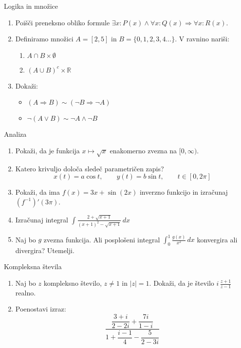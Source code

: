 \begin{frame}{Logika in množice}
	\begin{enumerate}
		\item
		Poišči preneksno obliko formule $\exists x: P(x) \land \forall x: Q(x) \Rightarrow \forall x: R(x)$.
		\item 
		Definiramo množici $A = [ 2,5 ]$ in $B = \{0, 1, 2, 3, 4 \ldots \}$.
		V ravnino nariši:
		\begin{enumerate}
		   \item $A \cap B \times \emptyset$
		   \item $(A \cup B)^c \times \mathbb{R}$
		\end{enumerate}
		
		\item
		Dokaži:
		\begin{itemize}
			\item $(A \Rightarrow B) \sim (\lnot B \Rightarrow \lnot A)$
			\item $\lnot (A \lor B) \sim \lnot A \land \lnot B$
		\end{itemize}
	\end{enumerate}
\end{frame}

\begin{frame}{Analiza}
	\begin{enumerate}
		\item
		Pokaži, da je funkcija $x \mapsto \sqrt{x}$ enakomerno zvezna na $[0,\infty)$.
		\item 
		Katero krivuljo določa sledeč parametričen zapis?
		$$
		   x(t) = a \cos t, \qquad
		   y(t) = b \sin t, \qquad
		   t \in [0, 2 \pi]
		$$ 
		
		\item
		Pokaži, da ima $f(x) = 3x + \sin(2x)$ inverzno funkcijo in izračunaj $(f^{-1})'(3\pi)$.
		
		\item
		Izračunaj integral 
		\( \displaystyle \int \frac{2+\sqrt{x+1}}{(x+1)^2-\sqrt{x+1}} \, dx \)
		\item 
		Naj bo $g$ zvezna funkcija. Ali posplošeni integral 
		\( \int_0^1 \frac{g(x)}{x^2}\,dx \)
		konvergira ali divergira? Utemelji.
	\end{enumerate}
\end{frame}

\begin{frame}{Kompleksna števila}
	\begin{enumerate}
		\item
		Naj bo $z$ kompleksno število, $z \ne 1$ in $|z| = 1$.
		Dokaži, da je število \( i\,\frac{z+1}{z-1} \) realno.
		\item
		Poenostavi izraz:
		$$ \frac{\dfrac{3+i}{2-2i} + \dfrac{7i}{1-i}}{1 + \dfrac{i-1}{4} - \dfrac{5}{2-3i}} $$
	\end{enumerate}
\end{frame}